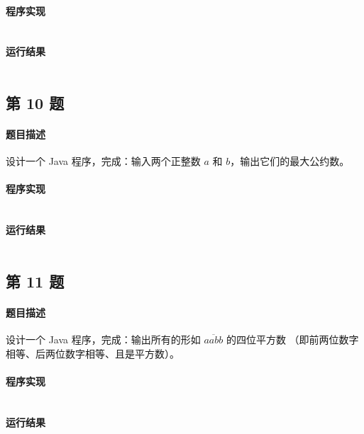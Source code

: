 \documentclass{academics}
\begin{document}
\paragraph{程序实现} {
    \inputminted[label=Solution.java]{java}{../src/P09/Solution.java}
}

\paragraph{运行结果} {
    \inputminted{text}{../res/P09.out}
}

\subsection{第 10 题}

\paragraph{题目描述} {
    设计一个 Java 程序，完成：输入两个正整数 $a$ 和 $b$，输出它们的最大公约数。
}

\paragraph{程序实现} {
    \inputminted[label=Solution.java]{java}{../src/P10/Solution.java}
}

\paragraph{运行结果} {
    \inputminted{text}{../res/P10.out}
}

\subsection{第 11 题}

\paragraph{题目描述} {
    设计一个 Java 程序，完成：输出所有的形如 $\overline{aabb}$ 的四位平方数 （即前两位数字相等、后两位数字相等、且是平方数）。
}

\paragraph{程序实现} {
    \inputminted[label=Solution.java]{java}{../src/P11/Solution.java}
}

\paragraph{运行结果} {
    \inputminted{text}{../res/P11.out}
}
\end{document}
